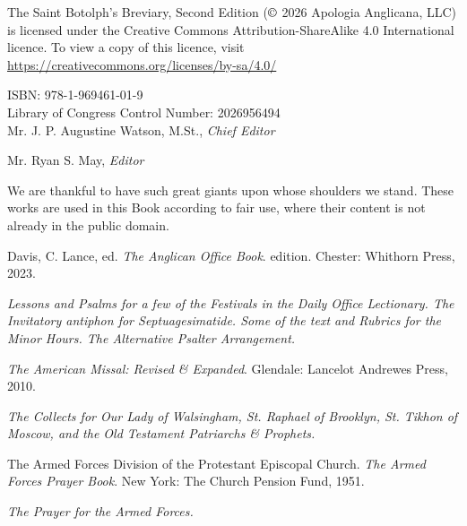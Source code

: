 \noindent
The Saint Botolph's Breviary, Second Edition ($\copyright$ 2026 Apologia Anglicana, LLC) is licensed under the Creative Commons Attribution-ShareAlike 4.0 International licence. To view a copy of this licence, visit \url{https://creativecommons.org/licenses/by-sa/4.0/}\\
\par\noindent

ISBN: 978-1-969461-01-9\\

Library of Congress Control Number: 2026956494\\

Mr. J. P. Augustine Watson, M.St., \textit{Chief Editor}

Mr. Ryan S. May, \textit{Editor}

\begin{center}
We are thankful to have such great giants upon whose shoulders we stand. These works are used in this Book according to fair use, where their content is not already in the public domain.%
\end{center}

Davis, C. Lance, ed. \textit{The Anglican Office Book}.  edition. Chester: Whithorn Press, 2023.\par\noindent
\textit{Lessons and Psalms for a few of the Festivals in the Daily Office Lectionary. The Invitatory antiphon for Septuagesimatide. Some of the text and Rubrics for the Minor Hours. The Alternative Psalter Arrangement.}

\vspace{0.5\baselineskip}

\textit{The American Missal: Revised \& Expanded}. Glendale: Lancelot Andrewes Press, 2010.\par\noindent
\textit{The Collects for Our Lady of Walsingham, St. Raphael of Brooklyn, St. Tikhon of Moscow, and the Old Testament Patriarchs \& Prophets.}

\vspace{0.5\baselineskip}

The Armed Forces Division of the Protestant Episcopal Church. \textit{The Armed Forces Prayer Book}. New York: The Church Pension Fund, 1951.\par\noindent
\textit{The Prayer for the Armed Forces.}

